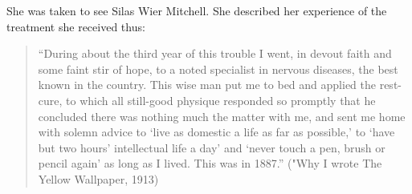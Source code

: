 \begin{refsection}
She was taken to see Silas Wier Mitchell. She described her experience of the treatment she received thus:

\begin{quote}

``During about the third year of this trouble I went, in devout faith and some faint stir of hope, to a noted specialist in nervous diseases, the best known in the country. This wise man put me to bed and applied the rest-cure, to which all still-good physique responded so promptly that he concluded there was nothing much the matter with me, and sent me home with solemn advice to `live as domestic a life as far as possible,' to `have but two hours' intellectual life a day' and `never touch a pen, brush or pencil again' as long as I lived. This was in 1887.'' ("Why I wrote The Yellow Wallpaper, 1913)
\end{quote}


\end{refsection}
